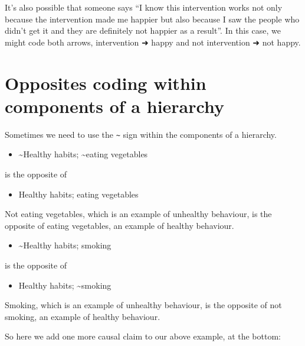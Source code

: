 \documentclass[
]{book}
\providecommand{\tightlist}{%
  \setlength{\itemsep}{0pt}\setlength{\parskip}{0pt}}
\begin{document}
It's also possible that someone says ``I know this intervention works not only because the intervention made me happier but also because I saw the people who didn't get it and they are definitely not happier as a result''. In this case, we might code both arrows, intervention ➜ happy and not intervention ➜ not happy.

\hypertarget{opposites-coding-within-components-of-a-hierarchy}{%
\section{Opposites coding within components of a hierarchy}\label{opposites-coding-within-components-of-a-hierarchy}}

Sometimes we need to use the \texttt{\textasciitilde{}} sign within the components of a hierarchy.

\begin{itemize}
\tightlist
\item
  \textasciitilde Healthy habits; \textasciitilde eating vegetables
\end{itemize}

is the opposite of

\begin{itemize}
\tightlist
\item
  Healthy habits; eating vegetables
\end{itemize}

Not eating vegetables, which is an example of unhealthy behaviour, is the opposite of eating vegetables, an example of healthy behaviour.

\begin{itemize}
\tightlist
\item
  \textasciitilde Healthy habits; smoking
\end{itemize}

is the opposite of

\begin{itemize}
\tightlist
\item
  Healthy habits; \textasciitilde smoking
\end{itemize}

Smoking, which is an example of unhealthy behaviour, is the opposite of not smoking, an example of healthy behaviour.

So here we add one more causal claim to our above example, at the bottom:
\end{document}
